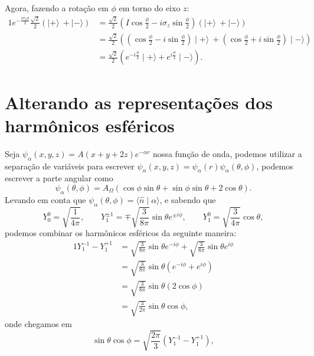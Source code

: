 \documentclass{article}
\newcommand{\ket}[1]{\mid\!\! #1 \rangle}
\newcommand{\braket}[2]{\langle #1 \!\mid\! #2 \rangle}
\begin{document}
Agora, fazendo a rotação em $\phi$ em torno do eixo $z$:
\begin{alignat}{1}
 e^{-\frac{i \sigma_z \phi}{2}} \frac{\sqrt{2}}{2}\left( \ket{+} \ + \ket{-} \right) &=
 \frac{\sqrt{2}}{2} \left(I \cos{\frac{\phi}{2}} - i \sigma_z \sin{\frac{\phi}{2}}\right) \left( \ket{+} \ + \ket{-} \right) \\
 &= \frac{\sqrt{2}}{2} \left( \left(\cos{\frac{\phi}{2}} - i \sin{\frac{\phi}{2}}\right)\ket{+} \ +
 \left(\cos{\frac{\phi}{2}} + i \sin{\frac{\phi}{2}}\right)\ket{-} \right) \\
 &= \frac{\sqrt{2}}{2} \left( e^{-i\frac{\phi}{2}}\ket{+} + e^{i\frac{\phi}{2}}\ket{-} \right)\mathrm{.}
\end{alignat}

\section{Alterando as representações dos harmônicos esféricos}
Seja $\psi_{\alpha}(x,y,z) = A (x + y + 2z)e^{-\alpha r}$ nossa função de onda, podemos utilizar a separação de variáveis para escrever
$\psi_{\alpha}(x,y,z) = \psi_{\alpha}(r)\psi_{\alpha}(\theta,\phi)$, podemos escrever a parte angular como
\begin{equation}
 \psi_{\alpha}(\theta,\phi) = A_{\Omega}(\cos{\phi}\sin{\theta}+\sin{\phi}\sin{\theta}+2\cos{\theta})\mathrm{.}
\end{equation}
Levando em conta que $\psi_{\alpha}(\theta,\phi) = \braket{\hat{n}}{\alpha}$, e sabendo que
\begin{equation}
 Y_0^0 = \sqrt{\frac{1}{4\pi}}\mathrm{,}\qquad Y^{\pm1}_1 = \mp\sqrt{\frac{3}{8\pi}}\sin{\theta} e^{\pm i \phi}\mathrm{,} \qquad
 Y^0_1 = \sqrt{\frac{3}{4\pi}} \cos{\theta}\mathrm{,}
\end{equation}
podemos combinar os harmônicos esféricos da seguinte maneira:
\begin{alignat}{1}
\nonumber
 Y^{-1}_{1} - Y^{+1}_{1} &= \sqrt{\frac{3}{8\pi}}\sin{\theta} e^{- i \phi} + \sqrt{\frac{3}{8\pi}}\sin{\theta} e^{ i \phi}\\ \nonumber
 &= \sqrt{\frac{3}{8\pi}}\sin{\theta} \left( e^{- i \phi} +  e^{ i \phi} \right) \\ \nonumber
 &= \sqrt{\frac{3}{8\pi}}\sin{\theta} \left( 2\cos{\phi} \right) \\
 &= \sqrt{\frac{3}{2\pi}} \sin{\theta}\cos{\phi}\mathrm{,}
\end{alignat}
onde chegamos em
\begin{equation}
 \sin{\theta}\cos{\phi} = \sqrt{\frac{2 \pi}{3}} \left( Y^{-1}_{1} - Y^{+1}_{1} \right)\mathrm{,}
\end{equation}
\end{document}
